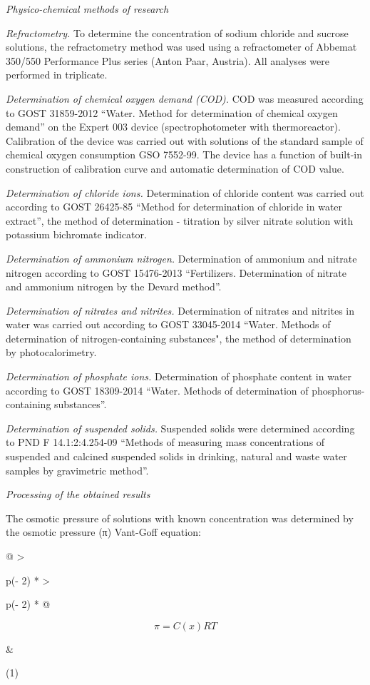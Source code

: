 \emph{Physico-chemical methods of research}

\emph{Refractometry.} To determine the concentration of sodium chloride
and sucrose solutions, the refractometry method was used using a
refractometer of Abbemat 350/550 Performance Plus series (Anton Paar,
Austria). All analyses were performed in triplicate.

\emph{Determination of chemical oxygen demand (COD).} COD was measured
according to GOST 31859-2012 ``Water. Method for determination of
chemical oxygen demand'' on the Expert 003 device (spectrophotometer
with thermoreactor). Calibration of the device was carried out with
solutions of the standard sample of chemical oxygen consumption GSO
7552-99. The device has a function of built-in construction of
calibration curve and automatic determination of COD value.

\emph{Determination of chloride ions.} Determination of chloride content
was carried out according to GOST 26425-85 ``Method for determination of
chloride in water extract'', the method of determination - titration by
silver nitrate solution with potassium bichromate indicator.

\emph{Determination of ammonium nitrogen.} Determination of ammonium and
nitrate nitrogen according to GOST 15476-2013 ``Fertilizers.
Determination of nitrate and ammonium nitrogen by the Devard method''.

\emph{Determination of nitrates and nitrites.} Determination of nitrates
and nitrites in water was carried out according to GOST 33045-2014
``Water. Methods of determination of nitrogen-containing substances",
the method of determination by photocalorimetry.

\emph{Determination of phosphate ions.} Determination of phosphate
content in water according to GOST 18309-2014 ``Water. Methods of
determination of phosphorus-containing substances''.

\emph{Determination of suspended solids.} Suspended solids were
determined according to PND F 14.1:2:4.254-09 ``Methods of measuring
mass concentrations of suspended and calcined suspended solids in
drinking, natural and waste water samples by gravimetric method''.

\emph{Processing of the obtained results}

The osmotic pressure of solutions with known concentration was
determined by the osmotic pressure (π) Vant-Goff equation:

\begin{longtable}[]{@{}
  >{\raggedright\arraybackslash}p{(\columnwidth - 2\tabcolsep) * }
  >{\raggedright\arraybackslash}p{(\columnwidth - 2\tabcolsep) * }@{}}
\toprule\noalign{}
\begin{minipage}[b]{\linewidth}\raggedright
\[\pi = C(x)RT\]
\end{minipage} & \begin{minipage}[b]{\linewidth}\raggedright
(1)
\end{minipage} \\
\midrule\noalign{}
\endhead
\bottomrule\noalign{}
\endlastfoot
\end{longtable}

